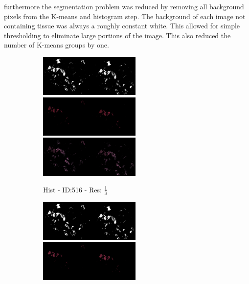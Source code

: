 \documentclass[a4paper,10pt,oneside]{article}
\begin{document}
furthermore the segmentation problem was reduced by removing all background pixels from the K-means and histogram step. The background of each image not containing tissue was always a roughly constant white. This allowed for simple thresholding to eliminate large portions of the image. This also reduced the number of K-means groups by one.

\begin{figure}[hbtp]
  \centering
  \begin{subfigure}[b]{5cm}
    \includegraphics[width=5cm]{visualization/results/histogramSeg/res_reduce_3/Region_0_PO13-00516A1_1_7_201305171148.png}
    \includegraphics[width=5cm]{visualization/results/histogramSeg/res_reduce_3/Region_1_PO13-00516A1_1_7_201305171148.png}
    \includegraphics[width=5cm]{visualization/results/histogramSeg/res_reduce_3/Region_2_PO13-00516A1_1_7_201305171148.png}
    \caption{Hist - ID:516 - Res: $\frac{1}{3}$}
  \end{subfigure}
  \begin{subfigure}[b]{5cm}
    \includegraphics[width=5cm]{visualization/results/histogramSeg/res_reduce_4/Region_0_PO13-00516A1_1_7_201305171148.png}
    \includegraphics[width=5cm]{visualization/results/histogramSeg/res_reduce_4/Region_1_PO13-00516A1_1_7_201305171148.png}

\end{subfigure}
\end{figure}
\end{document}
